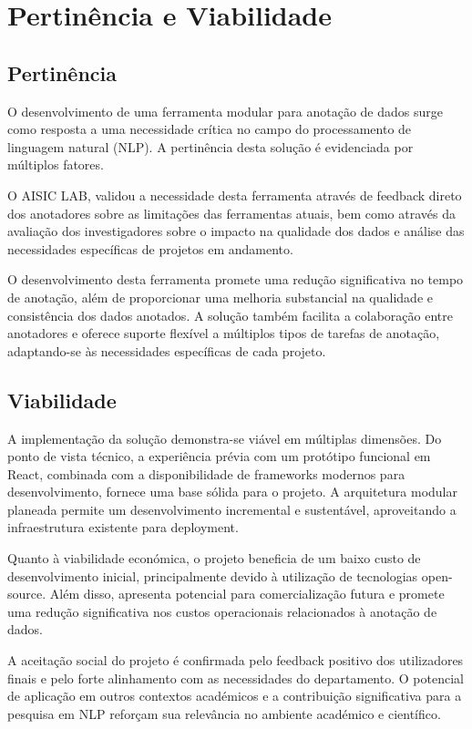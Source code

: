 \chapter{Pertinência e Viabilidade}

\section{Pertinência}
O desenvolvimento de uma ferramenta modular para anotação de dados surge como resposta a uma necessidade crítica no campo do processamento de linguagem natural (NLP). A pertinência desta solução é evidenciada por múltiplos fatores.

O AISIC LAB, validou a necessidade desta ferramenta através de feedback direto dos anotadores sobre as limitações das ferramentas atuais, bem como através da avaliação dos investigadores sobre o impacto na qualidade dos dados e análise das necessidades específicas de projetos em andamento.

O desenvolvimento desta ferramenta promete uma redução significativa no tempo de anotação, além de proporcionar uma melhoria substancial na qualidade e consistência dos dados anotados. A solução também facilita a colaboração entre anotadores e oferece suporte flexível a múltiplos tipos de tarefas de anotação, adaptando-se às necessidades específicas de cada projeto.

\section{Viabilidade}
A implementação da solução demonstra-se viável em múltiplas dimensões. Do ponto de vista técnico, a experiência prévia com um protótipo funcional em React, combinada com a disponibilidade de frameworks modernos para desenvolvimento, fornece uma base sólida para o projeto. A arquitetura modular planeada permite um desenvolvimento incremental e sustentável, aproveitando a infraestrutura existente para deployment.

Quanto à viabilidade económica, o projeto beneficia de um baixo custo de desenvolvimento inicial, principalmente devido à utilização de tecnologias open-source. Além disso, apresenta potencial para comercialização futura e promete uma redução significativa nos custos operacionais relacionados à anotação de dados.

A aceitação social do projeto é confirmada pelo feedback positivo dos utilizadores finais e pelo forte alinhamento com as necessidades do departamento. O potencial de aplicação em outros contextos académicos e a contribuição significativa para a pesquisa em NLP reforçam sua relevância no ambiente académico e científico.


